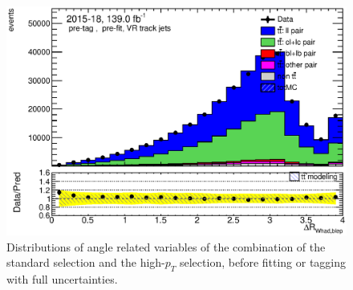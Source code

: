 \documentclass[letterpaper,12pt]{article}
\begin{document}
\begin{figure}
\begin{minipage}[b]{.45\textwidth}
	\includegraphics[width=1\textwidth]{Oct_distributions/pretagNoRwDL1rwithhighpTVRJets_scaledall/DataMC_dRWhadblep.eps} 
	\end{minipage}
	\caption{Distributions of angle related variables of the combination 
	of the standard selection and the high-$p_T$ 
	selection, before fitting or tagging with full uncertainties.} \label{fig:angles_VRJets}
	\end{figure}
	
\end{document}
